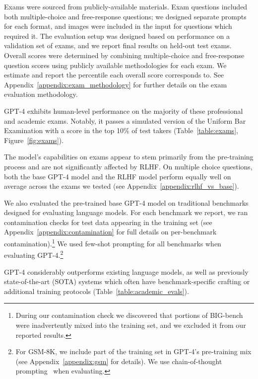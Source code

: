 \documentclass{article}
\begin{document}
Exams were sourced from publicly-available materials. Exam questions included both multiple-choice and free-response questions; we designed separate prompts for each format, and images were included in the input for questions which required it. The evaluation setup was designed based on performance on a validation set of exams, and we report final results on held-out test exams. Overall scores were determined by combining multiple-choice and free-response question scores using publicly available methodologies for each exam. We estimate and report the percentile each overall score corresponds to.
See Appendix~\ref{appendix:exam_methodology} for further details on the exam evaluation methodology.

GPT-4 exhibits human-level performance on the majority of these professional and academic exams. Notably, it passes a simulated version of the Uniform Bar Examination with a score in the top 10\% of test takers (Table~\ref{table:exams}, Figure~\ref{fig:exams}). 

The model's capabilities on exams appear to stem primarily from the pre-training process and are not significantly affected by RLHF. On multiple choice questions, both the base GPT-4 model and the RLHF model perform equally well on average across the exams we tested (see Appendix~\ref{appendix:rlhf_vs_base}).

We also evaluated the pre-trained base GPT-4 model on traditional benchmarks designed for evaluating language models. For each benchmark we report, we ran contamination checks for test data appearing in the training set (see Appendix~\ref{appendix:contamination} for full details on per-benchmark contamination).\footnote{During our contamination check we discovered that portions of BIG-bench~\citep{srivastava2022beyond} were inadvertently mixed into the training set, and we excluded it from our reported results.} We used few-shot prompting \citep{brown2020language} for all benchmarks when evaluating GPT-4.\footnote{For GSM-8K, we include part of the training set in GPT-4's pre-training mix (see Appendix~\ref{appendix:gsm} for details). We use chain-of-thought prompting~\citep{wei2022chain} when evaluating.}

GPT-4 considerably outperforms existing language models, as well as previously state-of-the-art (SOTA) systems which
often have benchmark-specific crafting or additional training protocols (Table~\ref{table:academic_evals}).
\end{document}
